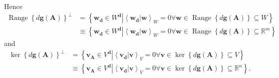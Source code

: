 \documentclass[aps,preprint]{revtex4}%
\begin{document}
Hence%
\begin{align*}
\operatorname*{Range}\left\{  d\boldsymbol{g}\left(  \boldsymbol{A}\right)
\right\}  ^{\bot} &  =\left\{  \boldsymbol{w}_{\boldsymbol{d}}\in
W^{\boldsymbol{d}}\left\vert \left\langle \left.  \boldsymbol{w}%
_{\boldsymbol{d}}\right\vert \boldsymbol{w}\right\rangle _{W}=0\forall
\boldsymbol{w}\in\operatorname*{Range}\left\{  d\boldsymbol{g}\left(
\boldsymbol{A}\right)  \right\}  \subseteq W\right.  \right\}  \\
&  \equiv\left\{  \boldsymbol{w}_{\boldsymbol{d}}\in W^{\boldsymbol{d}%
}\left\vert \left\langle \left.  \boldsymbol{w}_{\boldsymbol{d}}\right\vert
\boldsymbol{w}\right\rangle _{W}=0\forall\boldsymbol{w}\in
\operatorname*{Range}\left\{  d\boldsymbol{g}\left(  \boldsymbol{A}\right)
\right\}  \subseteq\mathbb{R}^{m}\right.  \right\}
\end{align*}
and
\begin{align*}
\ker\left\{  d\boldsymbol{g}\left(  \boldsymbol{A}\right)  \right\}  ^{\bot}
&  =\left\{  \boldsymbol{v}_{\boldsymbol{A}}\in V^{\boldsymbol{d}}\left\vert
\left\langle \left.  \boldsymbol{v}_{\boldsymbol{d}}\right\vert \boldsymbol{v}%
\right\rangle _{V}=0\forall\boldsymbol{v}\in\ker\left\{  d\boldsymbol{g}%
\left(  \boldsymbol{A}\right)  \right\}  \subseteq V\right.  \right\}  \\
&  \equiv\left\{  \boldsymbol{v}_{\boldsymbol{A}}\in V^{\boldsymbol{d}%
}\left\vert \left\langle \left.  \boldsymbol{v}_{\boldsymbol{d}}\right\vert
\boldsymbol{v}\right\rangle _{V}=0\forall\boldsymbol{v}\in\ker\left\{
d\boldsymbol{g}\left(  \boldsymbol{A}\right)  \right\}  \subseteq
\mathbb{R}^{n}\right.  \right\}  .
\end{align*}
\end{document}
